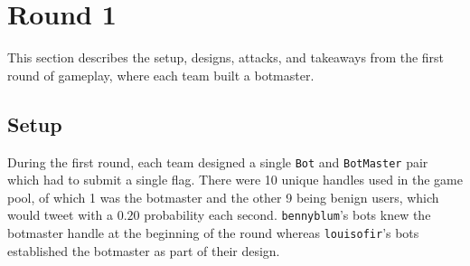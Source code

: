 \documentclass[11pt, oneside]{article} %
\numberwithin{equation}{section} %
\numberwithin{figure}{section} %
\numberwithin{table}{section} %
\renewcommand{\c}[1]{\texttt{#1}}
\newcommand{\teambb}{\c{bennyblum}}
\newcommand{\teamol}{\c{louisofir}}
\begin{document}



	

\section{Round 1}
	This section describes the setup, designs, attacks, and takeaways from the first round of gameplay, where each team
	built a botmaster.

	\subsection{Setup}
		During the first round, each team designed a single \c{Bot} and \c{BotMaster} pair which had to submit a single flag. There were 10 unique handles used in the game pool, of which 1 was the botmaster and the other 9 being benign users, which would tweet with a $0.20$ probability each second. \teambb{}'s bots knew the botmaster handle at the beginning of the round whereas \teamol{}'s bots established the botmaster as part of their design. \\
\end{document}
